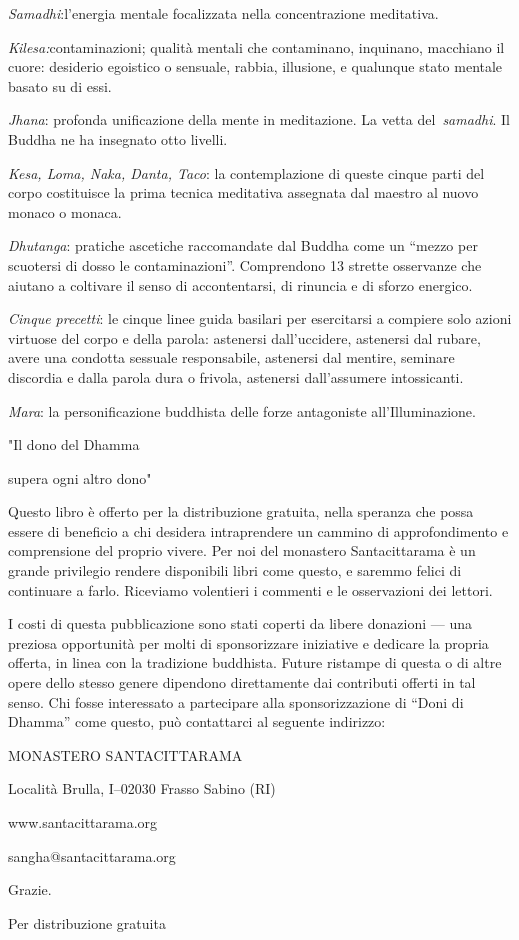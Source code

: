 \emph{Samadhi}:l'energia mentale focalizzata nella concentrazione
meditativa.

\emph{Kilesa:}contaminazioni; qualità mentali che contaminano,
inquinano, macchiano il cuore: desiderio egoistico o sensuale, rabbia,
illusione, e qualunque stato mentale basato su di essi.

\emph{Jhana}: profonda unificazione della mente in meditazione. La vetta
del~\emph{samadhi}. Il Buddha ne ha insegnato otto livelli.

\emph{Kesa, Loma, Naka, Danta, Taco}: la contemplazione di queste cinque
parti del corpo costituisce la prima tecnica meditativa assegnata dal
maestro al nuovo monaco o monaca.

\emph{Dhutanga}: pratiche ascetiche raccomandate dal Buddha come un
``mezzo per scuotersi di dosso le contaminazioni''. Comprendono 13
strette osservanze che aiutano a coltivare il senso di accontentarsi, di
rinuncia e di sforzo energico.

\emph{Cinque precetti}: le cinque linee guida basilari per esercitarsi a
compiere solo azioni virtuose del corpo e della parola: astenersi
dall'uccidere, astenersi dal rubare, avere una condotta sessuale
responsabile, astenersi dal mentire, seminare discordia e dalla parola
dura o frivola, astenersi dall'assumere intossicanti.

\emph{Mara}: la personificazione buddhista delle forze antagoniste
all'Illuminazione.

"Il dono del Dhamma

supera ogni altro dono"

Questo libro è offerto per la distribuzione gratuita, nella speranza che
possa essere di beneficio a chi desidera intraprendere un cammino di
approfondimento e comprensione del proprio vivere. Per noi del monastero
Santacittarama è un grande privilegio rendere disponibili libri come
questo, e saremmo felici di continuare a farlo. Riceviamo volentieri i
commenti e le osservazioni dei lettori.

I costi di questa pubblicazione sono stati coperti da libere donazioni
--- una preziosa opportunità per molti di sponsorizzare iniziative e
dedicare la propria offerta, in linea con la tradizione buddhista.
Future ristampe di questa o di altre opere dello stesso genere dipendono
direttamente dai contributi offerti in tal senso. Chi fosse interessato
a partecipare alla sponsorizzazione di ``Doni di Dhamma'' come questo,
può contattarci al seguente indirizzo:

MONASTERO SANTACITTARAMA

Località Brulla, I--02030 Frasso Sabino (RI)

www.santacittarama.org

sangha@santacittarama.org

Grazie.

Per distribuzione gratuita
